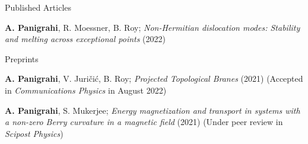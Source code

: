

\begin{cventries}

  \cventry
    {Published Articles} %
    {} %
    {} %
    {} %
    {
	  \begin{cvitems} %
      	\item{\textbf{A. Panigrahi}, R. Moessner, B. Roy; \textit{Non-Hermitian dislocation modes: Stability and melting across exceptional points} (2022) }
      \end{cvitems}
    }

  \cventry
	{Preprints} %
	{} %
	{} %
	{} %
	{
	  \begin{cvitems} %
		\item{\textbf{A. Panigrahi}, V. Juri\v{c}i\'c, B. Roy; \textit{Projected Topological Branes} (2021)} (Accepted in \textit{Communications Physics} in August 2022)
		\item{\textbf{A. Panigrahi}, S. Mukerjee; \textit{Energy magnetization and transport in systems with a non-zero Berry curvature in a magnetic field} (2021)
		 } (Under peer review in \textit{Scipost Physics})
	\end{cvitems}
}

\end{cventries}
